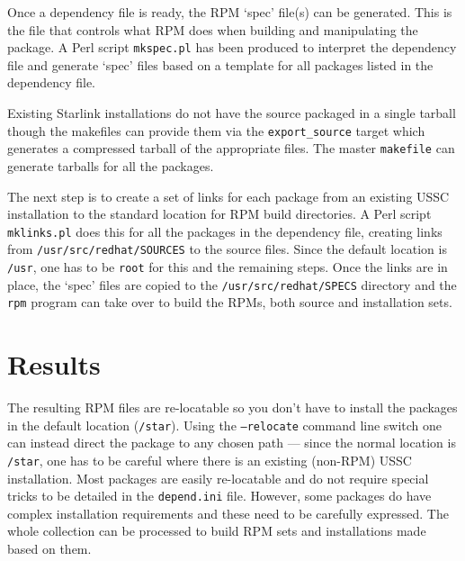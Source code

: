 Once a dependency file is ready, the RPM `spec' file(s) can be
generated. This is the file that controls what RPM does when building
and manipulating the package. A Perl script {\tt{mkspec.pl}} has been
produced to interpret the dependency file and generate `spec' files
based on a template for all packages listed in the dependency file.

Existing Starlink installations do not have the source packaged in a
single tarball though the makefiles can provide them via the 
{\tt{export\_source}} target which generates a compressed tarball of the
appropriate files.  The master {\tt{makefile}} can generate 
tarballs for all the packages.  

The next step is to create a set of links for each package from an
existing USSC installation to the standard location for RPM build
directories.  A Perl script {\tt{mklinks.pl}} does this for all the
packages in the dependency file, creating links from
{\tt{/usr/src/redhat/SOURCES}} to the source files.  Since the default
location is {\tt{/usr}}, one has to be {\tt{root}} for this and the remaining
steps.  Once the links are in place, the `spec' files are copied to the
{\tt{/usr/src/redhat/SPECS}} directory and the {\tt{rpm}} program can
take over to build the RPMs, both source and installation sets.


\section{Results}

The resulting RPM files are re-locatable so you don't have to install
the packages in the default location ({\tt{/star}}).  Using the
{\tt{--relocate}} command line switch one can instead direct the
package to any chosen path --- since the normal location is
{\tt{/star}}, one has to be careful where there is an existing
(non-RPM) USSC installation. Most packages are easily re-locatable and
do not require special tricks to be detailed in the {\tt{depend.ini}} file.
However, some packages do have complex installation requirements and
these need to be carefully expressed.  The whole collection can be
processed to build RPM sets and installations made based on them.


